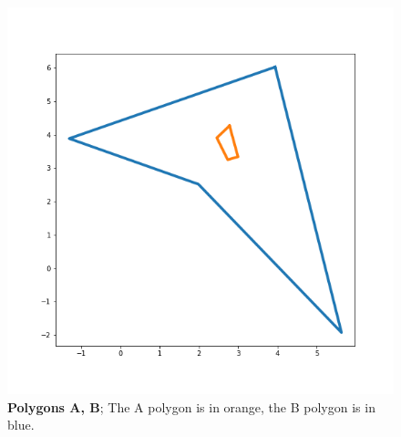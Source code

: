 \documentclass[12pt]{article}
\begin{document}
\begin{figure}[!htb]
\centering
\includegraphics[scale=0.8]{task2_polygons.png}
\caption{\textbf{Polygons A, B}; The A polygon is in orange, the B polygon is in blue.}
\label{polygons}
\end{figure}

\newpage
\end{document}
